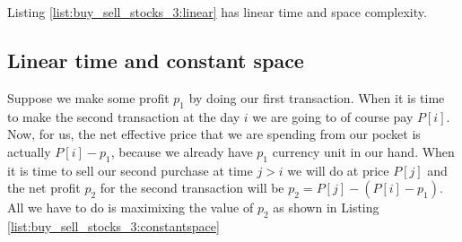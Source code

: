 Listing \ref{list:buy_sell_stocks_3:linear} has linear time and space complexity.


\subsection{Linear time and constant space}
Suppose we make some profit $p_1$ by doing our first transaction. 
When it is time to make the second transaction at the day $i$ we are going to of course pay $P[i]$.
Now, for us, the net effective price that we are spending from our pocket is actually  $P[i]-p_1$, because we already have $p_1$ currency unit in our hand.
When it is time to sell our second purchase at time $j>i$ we will do at price $P[j]$ and the net profit $p_2$ for the second transaction will be $p_2 = P[j] - (P[i]-p_1)$.
All we have to do is maximixing the value of $p_2$ as shown in Listing \ref{list:buy_sell_stocks_3:constantspace}


